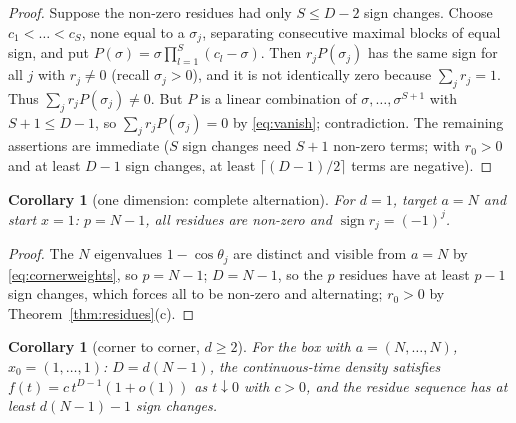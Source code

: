 \documentclass[11pt,a4paper]{article}
\theoremstyle{plain}
\newtheorem{corollary}[theorem]{Corollary}
\theoremstyle{definition}
\numberwithin{equation}{section}
\begin{document}
\begin{proof}
Suppose the non-zero residues had only $S\le D-2$ sign changes. Choose $c_1<\dots<c_S$, none equal to a $\sigma_j$, separating consecutive maximal blocks of equal sign, and put $P(\sigma)=\sigma\prod_{l=1}^S(c_l-\sigma)$. Then $r_jP(\sigma_j)$ has the same sign for all $j$ with $r_j\neq0$ (recall $\sigma_j>0$), and it is not identically zero because $\sum_jr_j=1$. Thus $\sum_jr_jP(\sigma_j)\ne0$. But $P$ is a linear combination of $\sigma,\dots,\sigma^{S+1}$ with $S+1\le D-1$, so $\sum_jr_jP(\sigma_j)=0$ by \eqref{eq:vanish}; contradiction. The remaining assertions are immediate ($S$ sign changes need $S+1$ non-zero terms; with $r_0>0$ and at least $D-1$ sign changes, at least $\lceil(D-1)/2\rceil$ terms are negative).
\end{proof}

\begin{corollary}[one dimension: complete alternation]\label{cor:1d}
For $d=1$, target $a=N$ and start $x=1$: $p=N-1$, all residues are non-zero and $\operatorname{sign}r_j=(-1)^j$.
\end{corollary}
\begin{proof}
The $N$ eigenvalues $1-\cos\theta_j$ are distinct and visible from $a=N$ by \eqref{eq:cornerweights}, so $p=N-1$; $D=N-1$, so the $p$ residues have at least $p-1$ sign changes, which forces all to be non-zero and alternating; $r_0>0$ by Theorem~\ref{thm:residues}(c).
\end{proof}

\begin{corollary}[corner to corner, $d\ge2$]\label{cor:ccsigns}
For the box with $a=(N,\dots,N)$, $x_0=(1,\dots,1)$: $D=d(N-1)$, the continuous-time density satisfies $f(t)=c\,t^{D-1}(1+o(1))$ as $t\downarrow0$ with $c>0$, and the residue sequence has at least $d(N-1)-1$ sign changes.
\end{corollary}
\end{document}
